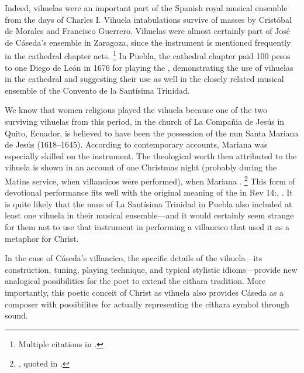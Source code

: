 Indeed, vihuelas were an important part of the Spanish royal musical ensemble from the days of Charles I.
Vihuela intabulations survive of masses by Cristóbal de Morales and Francisco Guerrero.%
	\autocite{Grove:Vihuela}
Vihuelas were almost certainly part of José de Cáseda's ensemble in Zaragoza, since the instrument is mentioned frequently in the cathedral chapter acts.%
	\footnote{%
	Multiple citations in \autocite{Calahorra:Zaragoza2}.
	}
In Puebla, the cathedral chapter paid 100 pesos to one Diego de León in 1676 for playing the ,%
	\autocite[44]{PerezRuiz:Aportes}
demonstrating the use of vihuelas in the cathedral and suggesting their use as well in the closely related musical ensemble of the Convento de la Santísima Trinidad.

We know that women religious played the vihuela because one of the two surviving vihuelas from this period, in the church of La Compañia de Jesús in Quito, Ecuador, is believed to have been the possession of the nun Santa Mariana de Jesús (1618--1645).
According to contemporary accounts, Mariana was especially skilled on the instrument. 
The theological worth then attributed to the vihuela is shown in an account of one Christmas night (probably during the Matins service, when villancicos were performed), when Mariana .
	\footnote{%
	\autocite[275]{EspinosaPolit:SantaMariana}, quoted in \autocite[73]{Bermudez:Vihuela}.
	}
This form of devotional performance fits well with the original meaning of the
 in Rev 14:, .%
	\autocite{BDAG}
It is quite likely that the nuns of La Santísima Trinidad in Puebla also included at least one vihuela in their musical ensemble---and it would certainly seem strange for them not to use that instrument in performing a villancico that used it as a metaphor for Christ.

In the case of Cáseda's villancico, the specific details of the vihuela---its construction, tuning, playing technique, and typical stylistic idioms---provide new analogical possibilities for the poet to extend the cithara tradition.
More importantly, this poetic conceit of Christ as vihuela also provides Cáseda as a composer with possibilites for actually representing the cithara symbol through sound.



